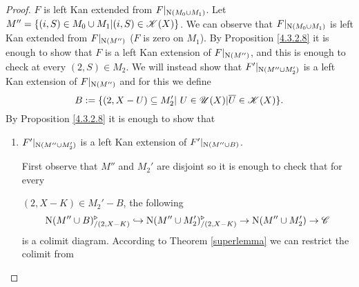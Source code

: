 \documentclass[../../thesis.tex]{subfiles}
\begin{document}
\begin{proof}
    $F$ is left Kan extended from $F|_{\mathrm{N}(M_0\cup M_1)}$.
    Let $M''=\{(i,S) \in M_0 \cup M_1 | (i,S)\in \mathscr{K}(X)\}$.
    We can observe that $F|_{\mathrm{N}(M_0 \cup M_1)}$ is left Kan extended from $F|_{\mathrm{N}(M'')}$ ($F$ is zero on $M_1$).
    By Proposition \ref{4.3.2.8} it is enough to show that $F$ is a left Kan extension of $F|_{\mathrm{N}(M'')}$, and this is enough to check at every $(2,S) \in M_2$.
    We will instead show that $F'|_{\mathrm{N}(M'' \cup M_2')}$ is a left Kan extension of $F|_{\mathrm{N}(M'')}$ and for this we define
    \[B:=\{(2, X- U) \subseteq M_2' | U \in \Open(X) | \overline{U} \in \K(X)\} .\]
    By Proposition \ref{4.3.2.8} it is enough to show that
    \begin{enumerate}[label=(\alph*)]
        \item $F'|_{\mathrm{N}(M'' \cup M_2')}$ is a left Kan extension of $F'|_{\mathrm{N}(M'' \cup B)}$.


              First observe that $M''$ and $M_2'$ are disjoint so it is enough to check that for every

              $(2,X-K)\in M_2' - B$, the following
              \[
                  \mathrm{N}(M'' \cup B)^{\triangleright}_{/(2,X-K)} \hookrightarrow  \mathrm{N}(M'' \cup M_2')^{\triangleright}_{/(2,X-K)} \to \mathrm{N}(M''\cup M_2') \to \mathscr{C}
              \]
              is a colimit diagram.
              According to Theorem \ref{superlemma} we can restrict the colimit from


\end{enumerate}
\end{proof}
\end{document}
